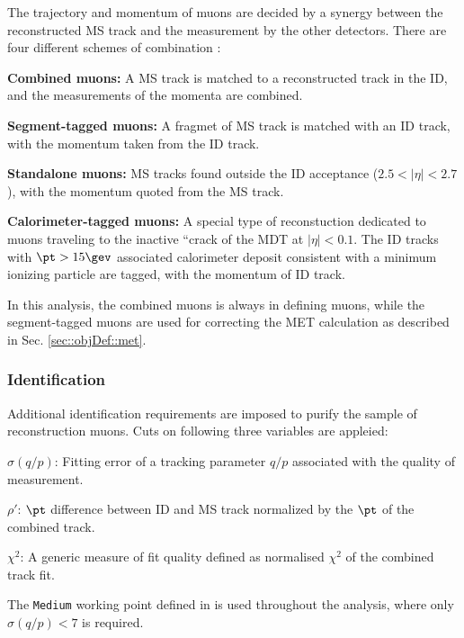 The trajectory and momentum of muons are decided by a synergy between the reconstructed MS track and the measurement by the other detectors.
There are four different schemes of combination \cite{165_muonPerf2011_2012}:
\begin{description}
\item \textbf{Combined muons:} 
A MS track is matched to a reconstructed track in the ID, and the measurements of the momenta are combined.

\item \textbf{Segment-tagged muons:} 
  A fragmet of MS track is matched with an ID track, with the momentum taken from the ID track.

\item \textbf{Standalone muons:} 
  MS tracks found outside the ID acceptance ($2.5 < |\eta| < 2.7$), with the momentum quoted from the MS track.

\item \textbf{Calorimeter-tagged muons:}
  A special type of reconstuction dedicated to muons traveling to the inactive “crack of the MDT at $|\eta|<0.1$.
  The ID tracks with $\pt>15\gev$ associated calorimeter deposit consistent with a minimum ionizing particle are tagged, with the momentum of ID track.
\end{description}
In this analysis, the combined muons is always in defining muons, while the segment-tagged muons are used for correcting the MET calculation as described in Sec. \ref{sec::objDef::met}.



\subsubsection{Identification} \label{sec::objDef::muons::id}
Additional identification requirements are imposed to purify the sample of reconstruction muons.
Cuts on following three variables are appleied:
\begin{description}
\item $\sigma(q/p)$: Fitting error of a tracking parameter $q/p$ associated with the quality of measurement. \\
\item $\rho'$:     \mbox{\phantom{MM}}  $\pt$ difference between ID and MS track normalized by the $\pt$ of the combined track. \\
\item $\chi^2$:   \mbox{\phantom{MM}}  
  A generic measure of fit quality defined as normalised $\chi^2$ of the combined track fit.
\end{description}
The \texttt{Medium} working point defined in \cite{166_muonPerformance2015data} is used throughout the analysis, 
where only $\sigma(q/p)<7$ is required.  \\

